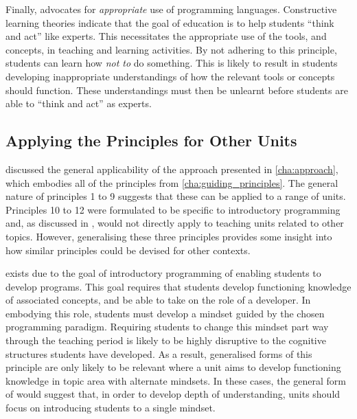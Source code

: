 Finally,  advocates for \emph{appropriate} use of programming languages. Constructive learning theories indicate that the goal of education is to help students ``think and act'' like experts. This necessitates the appropriate use of the tools, and concepts, in teaching and learning activities. By not adhering to this principle, students can learn how \emph{not to} do something. This is likely to result in students developing inappropriate understandings of how the relevant tools or concepts should function. These understandings must then be unlearnt before students are able to ``think and act'' as experts.


\subsection{Applying the Principles for Other Units} %
\label{sub:applying_the_principles_for_other_units}

 discussed the general applicability of the approach presented in \cref{cha:approach}, which embodies all of the principles from \cref{cha:guiding_principles}. The general nature of principles 1 to 9 suggests that these can be applied to a range of units. Principles 10 to 12 were formulated to be specific to introductory programming and, as discussed in , would not directly apply to teaching units related to other topics. However, generalising these three principles provides some insight into how similar principles could be devised for other contexts.

 exists due to the goal of introductory programming of enabling students to develop programs. This goal requires that students develop functioning knowledge of associated concepts, and be able to take on the role of a developer. In embodying this role, students must develop a mindset guided by the chosen programming paradigm. Requiring students to change this mindset part way through the teaching period is likely to be highly disruptive to the cognitive structures students have developed. As a result, generalised forms of this principle are only likely to be relevant where a unit aims to develop functioning knowledge in topic area with alternate mindsets. In these cases, the general form of  would suggest that, in order to develop depth of understanding, units should focus on introducing students to a single mindset.

